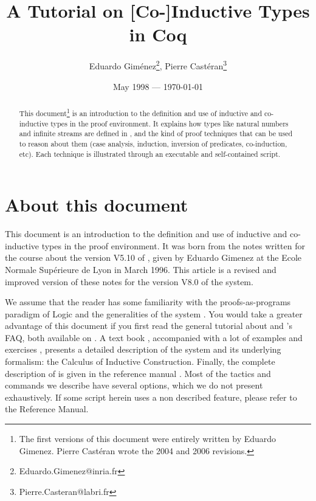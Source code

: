 \documentclass[11pt]{article}
\title{A Tutorial on [Co-]Inductive Types in Coq}
\author{Eduardo Gim\'enez\thanks{Eduardo.Gimenez@inria.fr},
Pierre Cast\'eran\thanks{Pierre.Casteran@labri.fr}}
\date{May 1998 --- \today}
\begin{document}
\maketitle

\begin{abstract}
This document\footnote{The first versions of this document were entirely written by Eduardo Gimenez.
Pierre Cast\'eran wrote the 2004 and 2006 revisions.} is an introduction to the definition and
use of inductive and co-inductive  types in the {\coq} proof environment. It explains how types like natural numbers and infinite streams are defined
in {\coq}, and the kind of proof techniques that can be used to reason
about them (case analysis, induction, inversion of predicates,
co-induction, etc).  Each technique is illustrated through an
executable and self-contained {\coq} script.
\end{abstract}


\cleardoublepage
\tableofcontents
\clearpage

\section{About this document}

This document is an introduction to the definition and use of
inductive and co-inductive  types in the {\coq} proof environment.  It was born from the
notes written for the course about the version V5.10 of {\coq}, given
by Eduardo Gimenez  at
the Ecole Normale Sup\'erieure de Lyon in March 1996. This article is
a revised and improved version of these notes for the version V8.0 of
the system.


We assume that the reader has some familiarity with the
proofs-as-programs paradigm of Logic \cite{Coquand:metamathematical} and the generalities
of the {\coq} system \cite{coqrefman}.  You would take a greater advantage of
this document if you first read the general tutorial about {\coq} and
{\coq}'s FAQ, both available on \cite{coqsite}.
A text book \cite{coqart},  accompanied with a lot of
examples and exercises \cite{Booksite}, presents a detailed description
of the {\coq} system and its underlying
formalism: the Calculus of Inductive Construction.
Finally, the complete description of {\coq}  is given in the reference manual
\cite{coqrefman}. Most of the tactics and commands we describe have
several options, which we do not present exhaustively.
If some script herein uses a non described feature, please refer to
the Reference Manual.
\end{document}
